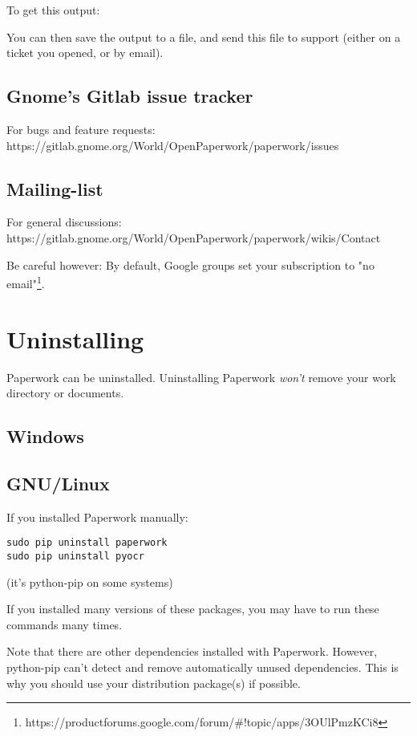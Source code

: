 \documentclass[10pt,a4paper]{article}
\begin{document}
To get this output:






You can then save the output to a file, and send this file to support
(either on a ticket you opened, or by email).

\subsection{Gnome's Gitlab issue tracker}

For bugs and feature requests: https://gitlab.gnome.org/World/OpenPaperwork/paperwork/issues


\subsection{Mailing-list}

For general discussions: https://gitlab.gnome.org/World/OpenPaperwork/paperwork/wikis/Contact

Be careful however: By default, Google groups set your subscription
to "no email"\footnote{https://productforums.google.com/forum/\#!topic/apps/3OUlPmzKCi8}.

\section{Uninstalling}

Paperwork can be uninstalled. Uninstalling Paperwork \emph{won't}
remove your work directory or documents.

\subsection{Windows}

\subsection{GNU/Linux}

If you installed Paperwork manually:
\begin{verbatim}
sudo pip uninstall paperwork
sudo pip uninstall pyocr
\end{verbatim}
(it's python-pip on some systems)

If you installed many versions of these packages, you may have to
run these commands many times.

Note that there are other dependencies installed with Paperwork. However,
python-pip can't detect and remove automatically unused dependencies.
This is why you should use your distribution package(s) if possible.
\end{document}
